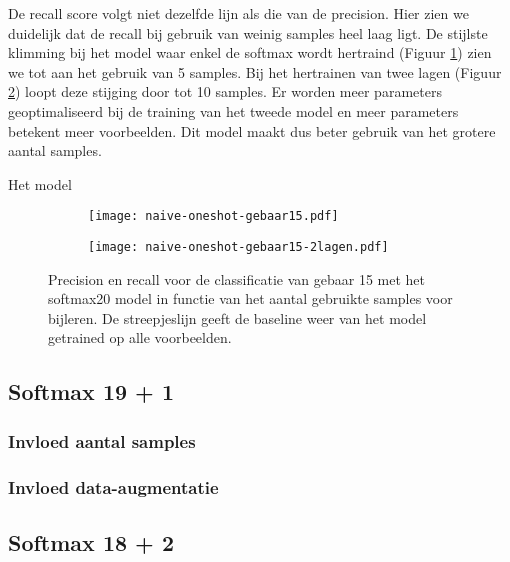 \npar De recall score volgt niet dezelfde lijn als die van de precision. Hier zien we duidelijk dat de recall bij gebruik van weinig samples heel laag ligt. De stijlste klimming bij het model waar enkel de softmax wordt hertraind (Figuur \ref{fig:naive-oneshot-gebaar15}) zien we tot aan het gebruik van 5 samples. Bij het hertrainen van twee lagen (Figuur \ref{fig:naive-oneshot-gebaar15-2lagen}) loopt deze stijging door tot 10 samples. Er worden meer parameters geoptimaliseerd bij de training van het tweede model en meer parameters betekent meer voorbeelden. Dit model maakt dus beter gebruik van het grotere aantal samples.

\npar Het model

\begin{figure}
	\begin{subfigure}[b]{\textwidth}
		\centering
		\texttt{[image: naive-oneshot-gebaar15.pdf]}
		\label{fig:naive-oneshot-gebaar15}
	\end{subfigure}%
	\par
	\begin{subfigure}[b]{\textwidth}
		\centering
		\texttt{[image: naive-oneshot-gebaar15-2lagen.pdf]}
				\label{fig:naive-oneshot-gebaar15-2lagen}
	\end{subfigure}
	\caption{Precision en recall voor de classificatie van gebaar 15 met het softmax20 model in functie van het aantal gebruikte samples voor bijleren. De streepjeslijn geeft de baseline weer van het model getrained op alle voorbeelden.}\label{fig:naive-model}
\end{figure}

\subsection{Softmax 19 + 1}
\subsubsection{Invloed aantal samples}
\subsubsection{Invloed data-augmentatie}\label{sec:19x1-augm}

\subsection{Softmax 18 + 2}